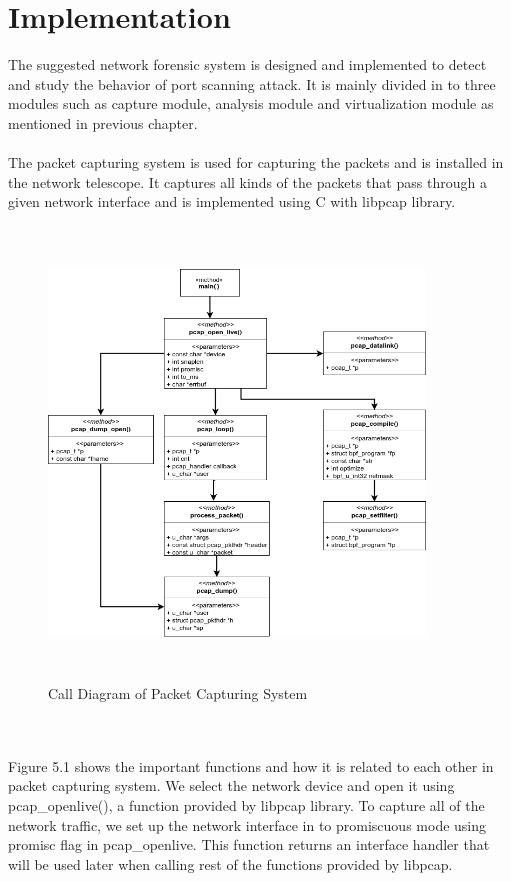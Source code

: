 \chapter{Implementation}
The suggested network forensic system is designed and implemented to detect and study the behavior of port scanning attack.
It is mainly divided in to three modules such as capture module, analysis module and virtualization module as mentioned in previous chapter.\\\\
The packet capturing system is used for capturing the packets and is installed in the network telescope.
It captures all kinds of the packets that pass through a given network interface and is implemented using C with libpcap library.
\begin{figure}[ht]
    \centering
	\includegraphics[width=10cm, height=12cm]{images/uml_packetcapture.png}
	\caption{Call Diagram of Packet Capturing System}
\end{figure}
\\\\
Figure 5.1 shows the important functions and how it is related to each other in packet capturing system.
We select the network device and open it using pcap\_openlive(), a function provided by libpcap library.
To capture all of the network traffic, we set up the network interface in to  promiscuous mode using promisc flag in pcap\_openlive.
This function returns an interface handler that will be used later when calling rest of the functions provided by libpcap.
